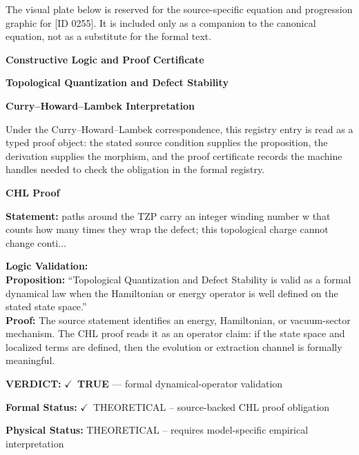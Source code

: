 \begingroup\footnotesize\sloppy
The visual plate below is reserved for the source-specific equation and progression graphic for [ID 0255]. It is included only as a companion to the canonical equation, not as a substitute for the formal text.
\par\endgroup
\ifTZPDarkEdition
{}
\fi

\clearpage
\begingroup\tzpsupportsetup
\noindent\textbf{\fontsize{10.8pt}{12.8pt}\selectfont [ID 0255] Constructive Logic and Proof Certificate}\par
\noindent\textbf{\fontsize{10pt}{12pt}\selectfont Topological Quantization and Defect Stability}\par
\vspace{0.45em}
\begingroup
\footnotesize
\setlength{\parskip}{0.22em}
\setlength{\parindent}{0pt}
\noindent\textbf{Curry--Howard--Lambek Interpretation}\par
Under the Curry--Howard--Lambek correspondence, this registry entry is read as a typed proof
object: the stated source condition supplies the proposition, the derivation supplies the
morphism, and the proof certificate records the machine handles needed to check the obligation
in the formal registry.

\vspace{0.45em}
\noindent\textbf{CHL Proof}\par
\textbf{Statement:} paths around the TZP carry an integer winding number w that counts how many times they
wrap the defect; this topological charge cannot change conti...

\textbf{Logic Validation:}\\
\textbf{Proposition:} ``Topological Quantization and Defect Stability is valid as a formal dynamical law when
the Hamiltonian or energy operator is well defined on the stated state space.''\\
\textbf{Proof:} The source statement identifies an energy, Hamiltonian, or vacuum-sector mechanism. The
CHL proof reads it as an operator claim: if the state space and localized terms are
defined, then the evolution or extraction channel is formally meaningful.

\textbf{VERDICT:} \ensuremath{\checkmark}\ \textbf{TRUE} --- formal dynamical-operator validation

\textbf{Formal Status:} \ensuremath{\checkmark}\ THEORETICAL -- source-backed CHL proof obligation

\textbf{Physical Status:} THEORETICAL -- requires model-specific empirical interpretation
\par\vspace{0.45em}
\par
\ifTZPDarkEdition
{}
\fi
\endgroup
\endgroup

